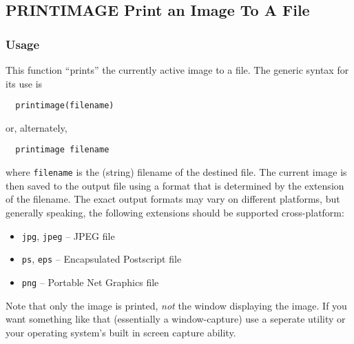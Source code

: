 %
%
%
\subsection{PRINTIMAGE Print an Image To A File}
\subsubsection{Usage}
This function ``prints'' the currently active image to a file.  The 
generic syntax for its use is
\begin{verbatim}
  printimage(filename)
\end{verbatim}
or, alternately,
\begin{verbatim}
  printimage filename
\end{verbatim}
where \verb|filename| is the (string) filename of the destined file.  The current
image is then saved to the output file using a format that is determined
by the extension of the filename.  The exact output formats may vary on
different platforms, but generally speaking, the following extensions
should be supported cross-platform:
\begin{itemize}
\item \verb|jpg|, \verb|jpeg|  --  JPEG file 
\item \verb|ps|, \verb|eps| -- Encapsulated Postscript file 
\item \verb|png| -- Portable Net Graphics file
\end{itemize}
Note that only the image is printed, \emph{not} the window displaying
the image.  If you want something like that (essentially a window-capture)
use a seperate utility or your operating system's built in screen
capture ability.
